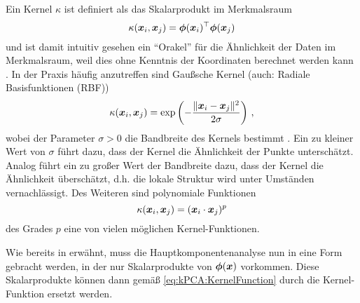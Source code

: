 Ein Kernel $\kappa$ ist definiert als das Skalarprodukt im Merkmalsraum \parencite[34]{ShaweTaylor.2011}
\begin{equation}
	\label{eq:kPCA:KernelFunction}
	\kappa(\bm{x}_i, \bm{x}_j) = \bm{\phi}(\bm{x}_i)^\top \bm{\phi}(\bm{x}_j)
\end{equation}
und ist damit intuitiv gesehen ein \enquote{Orakel} für die Ähnlichkeit der Daten im Merkmalsraum, weil dies ohne Kenntnis der Koordinaten berechnet werden kann \parencite[71]{ShaweTaylor.2011}. In der Praxis häufig anzutreffen sind Gaußsche Kernel (auch: Radiale
Basisfunktionen (RBF))
\begin{equation}
	\kappa(\bm{x}_i, \bm{x}_j) = \exp \left(- \frac{\lVert \bm{x}_i - \bm{x}_j\rVert^2}{2\sigma}\right) \, ,
\end{equation}
wobei der Parameter $\sigma > 0$ die Bandbreite des Kernels bestimmt \parencite[296]{ShaweTaylor.2011}. Ein zu kleiner Wert von $\sigma$ führt dazu, dass der Kernel die
Ähnlichkeit der Punkte unterschätzt. Analog führt ein zu großer Wert der Bandbreite dazu, dass der
Kernel die Ähnlichkeit überschätzt, d.h. die lokale Struktur wird unter Umständen vernachlässigt.
Des Weiteren sind polynomiale Funktionen \parencite[292]{ShaweTaylor.2011}
\begin{equation}
	\kappa(\bm{x}_i, \bm{x}_j) = (\bm{x}_i \cdot \bm{x}_j)^p
\end{equation}
des Grades $p$ eine von vielen möglichen Kernel-Funktionen.

Wie bereits in  erwähnt, muss die
Hauptkomponentenanalyse nun in eine Form gebracht werden, in der nur Skalarprodukte von
$\bm{\phi}(\bm{x})$ vorkommen. Diese Skalarprodukte können dann gemäß
\eqref{eq:kPCA:KernelFunction} durch die Kernel-Funktion ersetzt werden.

